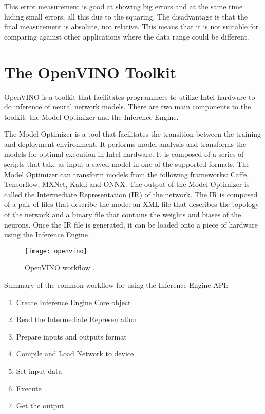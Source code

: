 This error measurement is good at showing big errors and at the same time hiding small errors, all this due to the squaring. The disadvantage is that the final measurement is absolute, not relative. This means that it is not suitable for comparing against other applications where the data range could be different.

\section{The OpenVINO Toolkit}

OpenVINO is a toolkit that facilitates programmers to utilize Intel hardware to do inference of neural network models. There are two main components to the toolkit: the Model Optimizer and the Inference Engine.

The Model Optimizer is a tool that facilitates the transition between the training and deployment environment. It performs model analysis and transforms the models for optimal execution in Intel hardware. It is composed of a series of scripts that take as input a saved model in one of the supported formats. The Model Optimizer can transform models from the following frameworks: Caffe, Tensorflow, MXNet, Kaldi and ONNX. The output of the Model Optimizer is called the Intermediate Representation (IR) of the network. The IR is composed of a pair of files that describe the mode: an XML file that describes the topology of the network and a binary file that contains the weights and biases of the neurons. Once the IR file is generated, it can be loaded onto a piece of hardware using the Inference Engine \cite{openvino_toolkit}.

\begin{figure}[thbp]
	\centering
	\texttt{[image: openvino]}
	\caption{OpenVINO workflow \cite{openvino_toolkit}.}
	\label{fig:openvino}
\end{figure}

Summary of the common workflow for using the Inference Engine API:

\begin{enumerate}
    \itemsep0em
	\item Create Inference Engine Core object
	\item Read the Intermediate Representation 
	\item Prepare inputs and outputs format
	\item Compile and Load Network to device
	\item Set input data
	\item Execute
	\item Get the output
\end{enumerate}
\item


